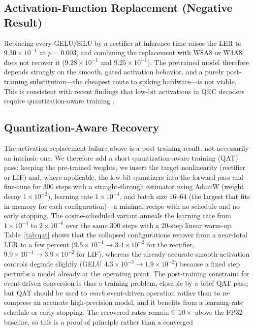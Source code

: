 ﻿\documentclass[conference]{IEEEtran}
\begin{document}
\subsection{Activation-Function Replacement (Negative Result)}
Replacing every GELU/SiLU by a rectifier at inference time raises the LER
to $9.30\times10^{-1}$ at $p{=}0.003$, and combining the replacement with
W8A8 or W4A8 does not recover it ($9.28\times10^{-1}$ and
$9.25\times10^{-1}$). The pretrained model therefore depends strongly on
the smooth, gated activation behavior, and a purely post-training
substitution---the cheapest route to spiking hardware---is not viable.
This is consistent with recent findings that low-bit activations in QEC
decoders require quantization-aware training \cite{rethink2026}.
\subsection{Quantization-Aware Recovery}
The activation-replacement failure above is a post-training result, not
necessarily an intrinsic one. We therefore add a short quantization-aware
training (QAT) pass: keeping the pre-trained weights, we insert the target
nonlinearity (rectifier or LIF) and, where applicable, the low-bit
quantizers into the forward pass and fine-tune for 300 steps with a
straight-through estimator using AdamW (weight decay $1\times10^{-2}$),
learning rate $1\times10^{-4}$, and batch size 16--64 (the largest that
fits in memory for each configuration)---a minimal recipe with no schedule
and no early stopping. The cosine-scheduled variant anneals the learning
rate from $1\times10^{-4}$ to $2\times10^{-6}$ over the same 300 steps
with a 20-step linear warm-up. Table~\ref{tab:qat} shows
that the collapsed configurations recover from a near-total LER to a few
percent ($9.5\!\times\!10^{-1}\!\rightarrow\!3.4\!\times\!10^{-2}$ for the
rectifier, $9.9\!\times\!10^{-1}\!\rightarrow\!3.9\!\times\!10^{-2}$ for
LIF), whereas the already-accurate smooth-activation controls degrade
slightly (GELU $4.3\!\times\!10^{-3}\!\rightarrow\!1.9\!\times\!10^{-2}$)
because a fixed step perturbs a model already at the operating point. The
post-training constraint for event-driven conversion is thus a training problem,
closable by a brief QAT pass; but QAT should be used to \emph{reach}
event-driven operation rather than to re-compress an accurate
high-precision model, and it benefits from a learning-rate schedule or
early stopping. The recovered rates remain $6$--$10\times$ above the FP32
baseline, so this is a proof of principle rather than a converged
\end{document}
